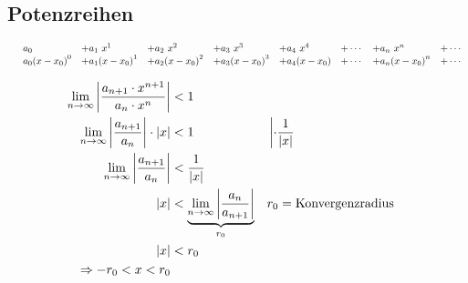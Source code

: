 \subsection{Potenzreihen}

\[
	\begin{array}{lll lll lll}
		 & a_0             & + a_1\ x^1        & + a_2\ x^2        & + a_3\ x^3        & + a_4\ x^4    & + \cdots & + a_n\ x^n        & + \cdots \\
		 & a_0 {(x-x_0)}^0 & + a_1 {(x-x_0)}^1 & + a_2 {(x-x_0)}^2 & + a_3 {(x-x_0)}^3 & + a_4 (x-x_0) & + \cdots & + a_n {(x-x_0)}^n & + \cdots
	\end{array}
\]

\begin{align*}
	\lim_{n \rightarrow{} \infty} \left| \frac{a_{n+1} \cdot x^{n+1}}{a_n \cdot x^n} \right| & < 1                                                                                                              \\
	\lim_{n \rightarrow{} \infty} \left| \frac{a_{n+1}}{a_n} \right| \cdot | x |             & < 1                                                                    &  & \left| \cdot \frac{1}{| x |} \right. \\
	\lim_{n \rightarrow{} \infty} \left| \frac{a_{n+1}}{a_n} \right|                         & < \frac{1}{| x |}                                                                                                \\
	| x |                                                                     & < \underbrace{\lim_{n \rightarrow{} \infty} \left| \frac{a_n}{a_{n+1}} \right|}_{r_0} &  & r_0 = \text{Konvergenzradius}        \\
	| x |                                                                     & < r_0                                                                                                            \\
	\Rightarrow -r_0 < x < r_0
\end{align*}

\begin{figure}[H]
	\centering
\end{figure}

